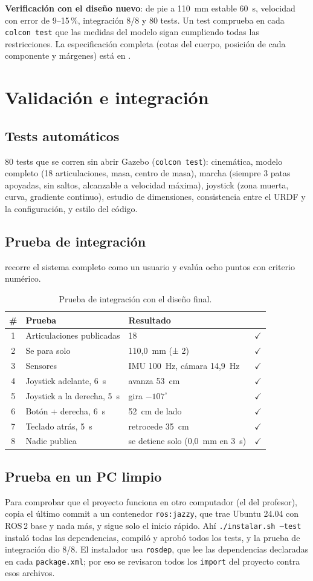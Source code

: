 \documentclass[11pt,a4paper]{article}
\newcommand{\ok}{\textcolor{Verde}{$\checkmark$}}
\newcommand{\seccion}[1]{\Needspace{18\baselineskip}\section{#1}}
\newcommand{\subsec}[1]{\Needspace{9\baselineskip}\subsection{#1}}
\begin{document}
\textbf{Verificación con el diseño nuevo}: de pie a 110~mm estable 60~s,
velocidad con error de 9--15\,\%, integración 8/8 y 80 tests. Un test
comprueba en cada \texttt{colcon test} que las medidas del modelo sigan
cumpliendo todas las restricciones. La especificación completa (cotas del
cuerpo, posición de cada componente y márgenes) está en
.

\seccion{Validación e integración}

\subsec{Tests automáticos}

80 tests que se corren sin abrir Gazebo (\texttt{colcon test}):
cinemática, modelo completo (18 articulaciones, masa, centro de masa),
marcha (siempre 3 patas apoyadas, sin saltos, alcanzable a velocidad
máxima), joystick (zona muerta, curva, gradiente continuo), estudio de
dimensiones, consistencia entre el URDF y la configuración, y estilo del
código.

\subsec{Prueba de integración}

 recorre el sistema completo como un
usuario y evalúa ocho puntos con criterio numérico.

\begin{table}[H]\centering\small
\caption{Prueba de integración con el diseño final.}\label{tab:integracion}
\begin{tabularx}{\linewidth}{@{}clYc@{}}
\toprule
\# & \textbf{Prueba} & \textbf{Resultado} & \\ & Articulaciones publicadas & 18 & \ok\\
2 & Se para solo & 110,0~mm (± 2) & \ok\\
3 & Sensores & IMU 100~Hz, cámara 14,9~Hz & \ok\\
4 & Joystick adelante, 6~s & avanza 53~cm & \ok\\
5 & Joystick a la derecha, 5~s & gira $-107^\circ$ & \ok\\
6 & Botón + derecha, 6~s & 52~cm de lado & \ok\\
7 & Teclado atrás, 5~s & retrocede 35~cm & \ok\\
8 & Nadie publica & se detiene solo (0,0~mm en 3~s) & \ok\\
\bottomrule
\end{tabularx}
\end{table}

\subsec{Prueba en un PC limpio}

Para comprobar que el proyecto funciona en otro computador (el del
profesor),  copia el último commit a
un contenedor \texttt{ros:jazzy}, que trae Ubuntu 24.04 con ROS\,2 base y
nada más, y sigue solo el inicio rápido. Ahí \texttt{./instalar.sh --test}
instaló todas las dependencias, compiló y aprobó todos los tests, y la
prueba de integración dio 8/8. El instalador usa \texttt{rosdep}, que lee
las dependencias declaradas en cada \texttt{package.xml}; por eso se
revisaron todos los \texttt{import} del proyecto contra esos archivos.
\end{document}
